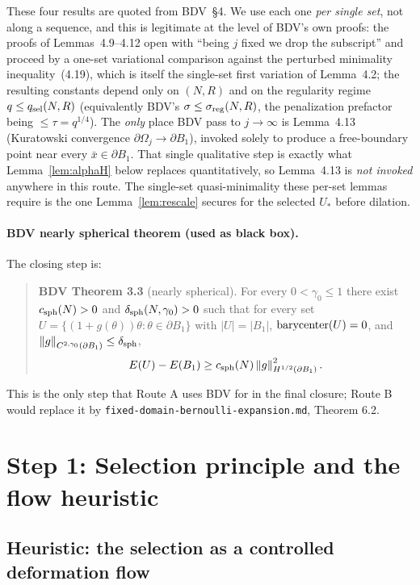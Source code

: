 \documentclass[11pt]{amsart}
\theoremstyle{definition}
\newcommand{\norm}[1]{\left\|#1\right\|}
\newcommand{\abs}[1]{\left|#1\right|}
\begin{document}
These four results are quoted from BDV~\S 4. We use each one \emph{per single
set}, not along a sequence, and this is legitimate at the level of BDV's own
proofs: the proofs of Lemmas~4.9--4.12 open with ``being $j$ fixed we drop the
subscript'' and proceed by a one-set variational comparison against the
perturbed minimality inequality~(4.19), which is itself the single-set first
variation of Lemma~4.2; the resulting constants depend only on $(N,R)$ and on
the regularity regime $q\le q_{\rm sel}(N,R)$ (equivalently BDV's
$\sigma\le\sigma_{\rm reg}(N,R)$, the penalization prefactor being
$\le\tau=q^{1/4}$). The \emph{only} place BDV pass to $j\to\infty$ is
Lemma~4.13 (Kuratowski convergence $\partial\Omega_j\to\partial B_1$), invoked
solely to produce a free-boundary point near every $\bar x\in\partial B_1$.
That single qualitative step is exactly what Lemma~\ref{lem:alphaH} below
replaces quantitatively, so Lemma~4.13 is \emph{not invoked} anywhere in this
route. The single-set quasi-minimality these per-set lemmas require is the one
Lemma~\ref{lem:rescale} secures for the selected $U_*$ before dilation.

\paragraph{BDV nearly spherical theorem (used as black box).}
The closing step is:
\begin{quote}
\textbf{BDV Theorem 3.3} (nearly spherical). For every $0<\gamma_0\le1$
there exist $c_{\rm sph}(N)>0$ and $\delta_{\rm sph}(N,\gamma_0)>0$ such that for every set
$U=\{(1+g(\theta))\theta:\theta\in\partial B_1\}$ with
$\abs{U}=\abs{B_1}$, $\hbox{barycenter}(U)=0$, and
$\norm{g}_{C^{2,\gamma_0}(\partial B_1)}\le\delta_{\rm sph}$,
\[
E(U)-E(B_1)\ge c_{\rm sph}(N)\norm{g}_{H^{1/2}(\partial B_1)}^2.
\]
\end{quote}
This is the only step that Route A uses BDV for in the final closure; Route B
would replace it by \texttt{fixed-domain-bernoulli-expansion.md}, Theorem 6.2.

\section{Step 1: Selection principle and the flow heuristic}\label{sec:step1-selection}



\subsection{Heuristic: the selection as a controlled deformation flow}
\label{ss:flow-heuristic}
\end{document}
